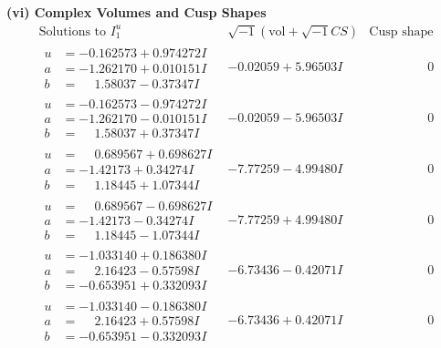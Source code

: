 \documentclass[1p]{elsarticle_modified}
\theoremstyle{definition}
\newcommand{\I}{\sqrt{-1}}
\begin{document}
\newpage\flushleft \textbf{(vi) Complex Volumes and Cusp Shapes}
$$\begin{array}{c|c|c}  
\text{Solutions to }I^u_{1}& \I (\text{vol} + \sqrt{-1}CS) & \text{Cusp shape}\\
 \hline 
\begin{aligned}
u &= -0.162573 + 0.974272 I \\
a &= -1.262170 + 0.010151 I \\
b &= \phantom{-}1.58037 - 0.37347 I\end{aligned}
 & -0.02059 + 5.96503 I & \phantom{-0.000000 } 0 \\ \hline\begin{aligned}
u &= -0.162573 - 0.974272 I \\
a &= -1.262170 - 0.010151 I \\
b &= \phantom{-}1.58037 + 0.37347 I\end{aligned}
 & -0.02059 - 5.96503 I & \phantom{-0.000000 } 0 \\ \hline\begin{aligned}
u &= \phantom{-}0.689567 + 0.698627 I \\
a &= -1.42173 + 0.34274 I \\
b &= \phantom{-}1.18445 + 1.07344 I\end{aligned}
 & -7.77259 - 4.99480 I & \phantom{-0.000000 } 0 \\ \hline\begin{aligned}
u &= \phantom{-}0.689567 - 0.698627 I \\
a &= -1.42173 - 0.34274 I \\
b &= \phantom{-}1.18445 - 1.07344 I\end{aligned}
 & -7.77259 + 4.99480 I & \phantom{-0.000000 } 0 \\ \hline\begin{aligned}
u &= -1.033140 + 0.186380 I \\
a &= \phantom{-}2.16423 - 0.57598 I \\
b &= -0.653951 + 0.332093 I\end{aligned}
 & -6.73436 - 0.42071 I & \phantom{-0.000000 } 0 \\ \hline\begin{aligned}
u &= -1.033140 - 0.186380 I \\
a &= \phantom{-}2.16423 + 0.57598 I \\
b &= -0.653951 - 0.332093 I\end{aligned}
 & -6.73436 + 0.42071 I & \phantom{-0.000000 } 0 \\ \hline\begin{aligned}

\end{aligned}
\end{array}$$
\end{document}
